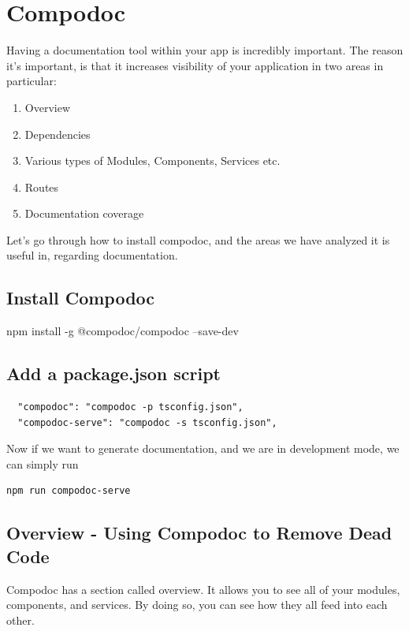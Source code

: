 
\chapter{ Compodoc }
Having a documentation tool within your app is incredibly important. The reason it's important, is that it increases visibility of your application in two areas in particular:
\begin{enumerate}
  \item Overview 
  \item Dependencies
  \item Various types of Modules, Components, Services etc. 
  \item Routes
  \item Documentation coverage
\end{enumerate}

Let's go through how to install compodoc, and the areas we have analyzed it is useful in, regarding documentation. 

\section{ Install Compodoc }
npm install -g @compodoc/compodoc --save-dev

\section{ Add a package.json script }
\begin{verbatim}
  "compodoc": "compodoc -p tsconfig.json",
  "compodoc-serve": "compodoc -s tsconfig.json",
\end{verbatim}

Now if we want to generate documentation, and we are in development mode, we can simply run 
\begin{verbatim}
npm run compodoc-serve  
\end{verbatim}

\section{Overview - Using Compodoc to Remove Dead Code}
Compodoc has a section called overview. It allows you to see all of your modules, components, and services. By doing so, you can see how they all feed into each other. 

